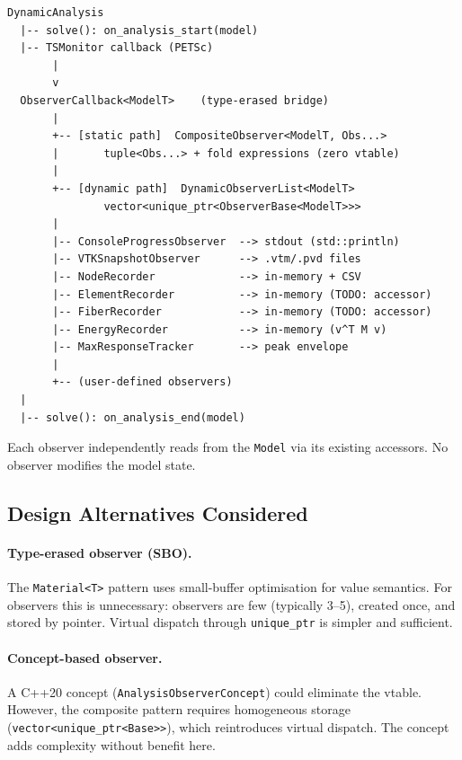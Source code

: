 \begin{center}
\begin{minipage}{0.80\textwidth}
\small
\begin{verbatim}
DynamicAnalysis
  |-- solve(): on_analysis_start(model)
  |-- TSMonitor callback (PETSc)
       |
       v
  ObserverCallback<ModelT>    (type-erased bridge)
       |
       +-- [static path]  CompositeObserver<ModelT, Obs...>
       |       tuple<Obs...> + fold expressions (zero vtable)
       |
       +-- [dynamic path]  DynamicObserverList<ModelT>
               vector<unique_ptr<ObserverBase<ModelT>>>
       |
       |-- ConsoleProgressObserver  --> stdout (std::println)
       |-- VTKSnapshotObserver      --> .vtm/.pvd files
       |-- NodeRecorder             --> in-memory + CSV
       |-- ElementRecorder          --> in-memory (TODO: accessor)
       |-- FiberRecorder            --> in-memory (TODO: accessor)
       |-- EnergyRecorder           --> in-memory (v^T M v)
       |-- MaxResponseTracker       --> peak envelope
       |
       +-- (user-defined observers)
  |
  |-- solve(): on_analysis_end(model)
\end{verbatim}
\end{minipage}
\end{center}

Each observer independently reads from the \texttt{Model} via its
existing accessors.  No observer modifies the model state.


\subsection{Design Alternatives Considered}

\paragraph{Type-erased observer (SBO).}
The \texttt{Material<T>} pattern uses small-buffer optimisation for
value semantics.  For observers this is unnecessary: observers are
few (typically 3--5), created once, and stored by pointer.  Virtual
dispatch through \texttt{unique\_ptr} is simpler and sufficient.

\paragraph{Concept-based observer.}
A C++20 concept (\texttt{AnalysisObserverConcept}) could eliminate the
vtable.  However, the composite pattern requires homogeneous storage
(\texttt{vector<unique\_ptr<Base>>}), which reintroduces virtual
dispatch.  The concept adds complexity without benefit here.

